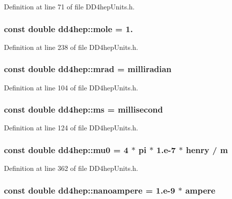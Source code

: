 Definition at line 71 of file DD4hepUnits.h.\hypertarget{namespacedd4hep_a09193b4505440f7f2a58f02fbea9120f}{
\subsubsection[{mole}]{\setlength{\rightskip}{0pt plus 5cm}const double {\bf dd4hep::mole} = 1.}}
\label{namespacedd4hep_a09193b4505440f7f2a58f02fbea9120f}


Definition at line 238 of file DD4hepUnits.h.\hypertarget{namespacedd4hep_acc4b11e3d4313ca95a536c6467087bb1}{
\subsubsection[{mrad}]{\setlength{\rightskip}{0pt plus 5cm}const double {\bf dd4hep::mrad} = {\bf milliradian}}}
\label{namespacedd4hep_acc4b11e3d4313ca95a536c6467087bb1}


Definition at line 104 of file DD4hepUnits.h.\hypertarget{namespacedd4hep_a75a019cb4a909458c79262a2a401662a}{
\subsubsection[{ms}]{\setlength{\rightskip}{0pt plus 5cm}const double {\bf dd4hep::ms} = {\bf millisecond}}}
\label{namespacedd4hep_a75a019cb4a909458c79262a2a401662a}


Definition at line 124 of file DD4hepUnits.h.\hypertarget{namespacedd4hep_aa3e5df0c9242afa74216e69bac6e639b}{
\subsubsection[{mu0}]{\setlength{\rightskip}{0pt plus 5cm}const double {\bf dd4hep::mu0} = 4 $\ast$ {\bf pi} $\ast$ 1.e-\/7 $\ast$ {\bf henry} / {\bf m}}}
\label{namespacedd4hep_aa3e5df0c9242afa74216e69bac6e639b}


Definition at line 362 of file DD4hepUnits.h.\hypertarget{namespacedd4hep_aab51ca424c36f5bc349f01bf9c502f2d}{
\subsubsection[{nanoampere}]{\setlength{\rightskip}{0pt plus 5cm}const double {\bf dd4hep::nanoampere} = 1.e-\/9 $\ast$ {\bf ampere}}}
\label{namespacedd4hep_aab51ca424c36f5bc349f01bf9c502f2d}


